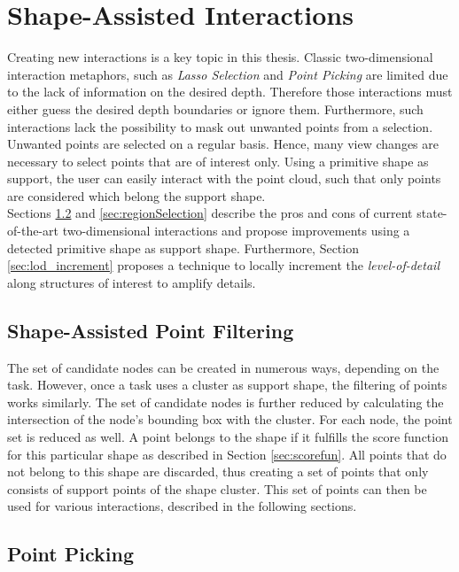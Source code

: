 \section{Shape-Assisted Interactions}
\label{sec:interactions}

Creating new interactions is a key topic in this thesis. Classic two-dimensional interaction metaphors, such as \textit{Lasso Selection} and \textit{Point Picking} are limited due to the lack of information on the desired depth. Therefore those interactions must either guess the desired depth boundaries or ignore them. Furthermore, such interactions lack the possibility to mask out unwanted points from a selection. Unwanted points are selected on a regular basis. Hence, many view changes are necessary to select points that are of interest only. Using a primitive shape as support, the user can easily interact with the point cloud, such that only points are considered which belong the support shape. 
\\
Sections \ref{sec:pointPicking} and \ref{sec:regionSelection} describe the pros and cons of current state-of-the-art two-dimensional interactions and propose improvements using a detected primitive shape as support shape. Furthermore, Section \ref{sec:lod_increment} proposes a technique to locally increment the \textit{level-of-detail} along structures of interest to amplify details. 


\subsection{Shape-Assisted Point Filtering}
\label{sec:pointFiltering}

The set of candidate nodes can be created in numerous ways, depending on the task. However, once a task uses a cluster as support shape, the filtering of points works similarly. The set of candidate nodes is further reduced by calculating the intersection of the node's bounding box with the cluster. For each node, the point set is reduced as well. A point belongs to the shape if it fulfills the score function for this particular shape as described in Section \ref{sec:scorefun}. All points that do not belong to this shape are discarded, thus creating a set of points that only consists of support points of the shape cluster. This set of points can then be used for various interactions, described in the following sections. 


\subsection{Point Picking}
\label{sec:pointPicking}

